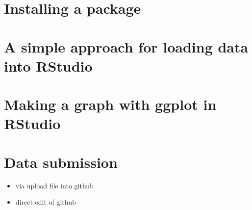 \documentclass[]{book}
\providecommand{\tightlist}{%
  \setlength{\itemsep}{0pt}\setlength{\parskip}{0pt}}
\begin{document}
\hypertarget{installing-a-package}{%
\chapter{Installing a package}\label{installing-a-package}}

\hypertarget{a-simple-approach-for-loading-data-into-rstudio}{%
\chapter{A simple approach for loading data into RStudio}\label{a-simple-approach-for-loading-data-into-rstudio}}

\hypertarget{making-a-graph-with-ggplot-in-rstudio}{%
\chapter{Making a graph with ggplot in RStudio}\label{making-a-graph-with-ggplot-in-rstudio}}

\hypertarget{data-submission}{%
\chapter{Data submission}\label{data-submission}}

\begin{itemize}
\tightlist
\item
  via upload file into github
\item
  direct edit of github
\end{itemize}


\end{document}

